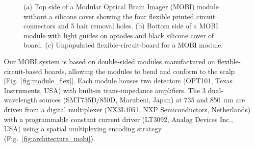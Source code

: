 \begin{figure}
\begin{minipage}{.35\textwidth}
\begin{center}
	    \end{center}  
    \end{minipage}%
	\caption{(a) Top side of a Modular Optical Brain Imager (MOBI) module without a silicone cover showing the four flexible printed circuit connectors and 5 hair removal holes. (b) Bottom side of a MOBI module with light guides on optodes and black silicone cover of board. (c) Unpopulated flexible-circuit-board for a MOBI module.} 
	\label{fig:module}
\end{figure}

Our \ac{MOBI} system is based on double-sided modules manufactured on flexible-circuit-based boards, allowing the modules to bend and conform to the scalp [Fig.~\ref{fig:module_flex}]. Each module houses two detectors (OPT101, Texas Instruments, USA) with built-in trans-impedance amplifiers. The 3 dual-wavelength sources (SMT735D/850D, Marubeni, Japan) at 735 and 850~nm are driven from a digital multiplexer (NX3L4051, NXP Semiconductors, Netherlands) with a programmable constant current driver (LT3092, Analog Devices Inc., USA) using a spatial multiplexing encoding strategy (Fig.~\ref{fig:architecture_mobi}). 

